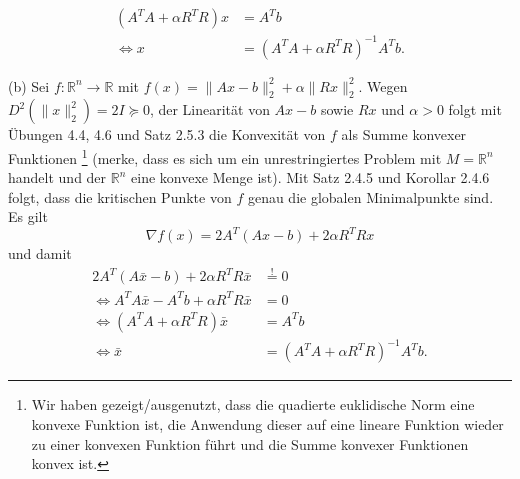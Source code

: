 \documentclass[ngerman, a4paper,12pt]{article}
\begin{document}
\begin{equation*}
	\begin{split}
	(A^TA+\alpha R^TR)x &=A^Tb \\
	\Leftrightarrow x&= (A^TA+\alpha R^TR)^{-1} A^Tb.
	\end{split}
\end{equation*}
\par
(b) Sei $f: \mathbb{R}^n \rightarrow \mathbb{R}$ mit $f(x) = \|Ax-b \|_2^2 + \alpha \|Rx \|_2^2$. Wegen $D^2( \|x \|_2^2)=2I \succeq 0$, der Linearität von $Ax-b$ sowie $Rx$ und $\alpha > 0$ folgt mit Übungen 4.4, 4.6 und Satz 2.5.3 die Konvexität von $f$ als Summe konvexer Funktionen \footnote{Wir haben gezeigt/ausgenutzt, dass die quadierte euklidische Norm eine konvexe Funktion ist, die Anwendung dieser auf eine lineare Funktion wieder zu einer konvexen Funktion führt und die Summe konvexer Funktionen konvex ist.} (merke, dass es sich um ein unrestringiertes Problem mit $M=\mathbb{R}^n$ handelt und der $\mathbb{R}^n$ eine konvexe Menge ist). Mit Satz 2.4.5 und Korollar 2.4.6 folgt, dass die kritischen Punkte von $f$ genau die globalen Minimalpunkte sind. Es gilt
\begin{equation}
	\nabla f(x) = 2A^T(Ax-b) + 2\alpha R^TRx
\end{equation}
und damit
\begin{equation*}
	\begin{split}
		2A^T(A\bar{x}-b) + 2\alpha R^TR\bar{x} &\stackrel{!}{=} 0 \\
		\Leftrightarrow A^TA\bar{x}-A^Tb+\alpha R^TR\bar{x} &=0 \\
		\Leftrightarrow (A^TA+\alpha R^TR)\bar{x} &=A^Tb \\
		\Leftrightarrow \bar{x} &= (A^TA+\alpha R^TR)^{-1}A^Tb.
	\end{split}
\end{equation*}
\end{document}
